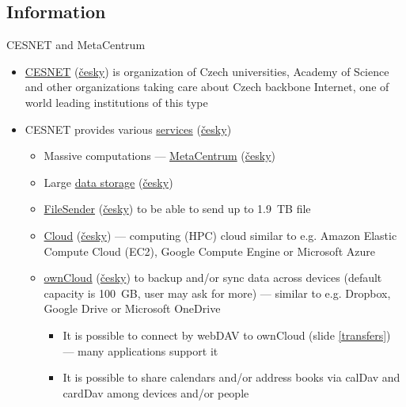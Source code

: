 \documentclass[compress, xelatex, 11pt, xcolor=svgnames, aspectratio=169,
	hyperref={
		bookmarks=true,
		unicode=true,
		colorlinks=true,
		pdftitle={Linux, command line and MetaCentrum},
		plainpages=false,
		pdfauthor={Vojtech Zeisek},
		pdfsubject={Course about use of Linux command line, writing shell scripts and using MetaCentrum of CESNET},
		pdfcreator={XeLaTeX},
		pdfkeywords={Linux, GNU, BASH, shell, command line, MetaCentrum},
		linkcolor=DarkRed, %
		anchorcolor=DarkBlue, %
		citecolor=Indigo, %
		filecolor=NavyBlue, %
		menucolor=DarkMagenta, %
		urlcolor=DarkBlue, %
		},
	url={hyphens, lowtilde} %
	]{beamer}
\begin{document}
\subsection{Information}

\begin{frame}[allowframebreaks]{CESNET and MetaCentrum}
	\label{CESNET}
	\begin{itemize}
		\item \href{https://www.cesnet.cz/?lang=en}{CESNET} (\href{https://www.cesnet.cz/}{česky}) is organization of Czech universities, Academy of Science and other organizations taking care about Czech backbone Internet, one of world leading institutions of this type
		\item CESNET provides various \href{https://www.cesnet.cz/services/?lang=en}{services} (\href{https://www.cesnet.cz/sluzby/}{česky})
		\begin{itemize}
			\item Massive computations --- \href{https://www.cesnet.cz/services/massive-computations-metacentrum/?lang=en}{MetaCentrum} (\href{https://www.cesnet.cz/sluzby/metacentrum/}{česky})
			\item Large \href{https://www.cesnet.cz/services/data-storage/?lang=en}{data storage} (\href{https://www.cesnet.cz/sluzby/datova-uloziste/}{česky})
			\item \href{https://www.cesnet.cz/services/filesender/?lang=en}{FileSender} (\href{https://www.cesnet.cz/sluzby/filesender/}{česky}) to be able to send up to 1.9~TB file
			\item \href{https://www.metacentrum.cz/en/Sluzby/Cloud/}{Cloud} (\href{https://www.metacentrum.cz/cs/Sluzby/Cloud/}{česky}) --- computing (HPC) cloud similar to e.g. Amazon Elastic Compute Cloud (EC2), Google Compute Engine or Microsoft Azure
			\item \href{https://www.cesnet.cz/services/owncloud/?lang=en}{ownCloud} (\href{https://www.cesnet.cz/sluzby/owncloud/}{česky}) to backup and/or sync data across devices (default capacity is 100~GB, user may ask for more) --- similar to e.g. Dropbox, Google Drive or Microsoft OneDrive
			\begin{itemize}
				\item It is possible to connect by webDAV to ownCloud (slide \ref{transfers}) --- many applications support it
				\item It is possible to share calendars and/or address books via calDav and cardDav among devices and/or people
			\end{itemize}

\end{itemize}
\end{itemize}
\end{frame}
\end{document}
